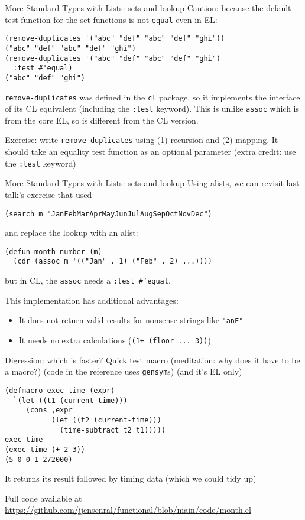 \documentclass[presentation]{beamer}
\begin{document}
\begin{frame}[fragile]{More Standard Types with Lists: sets and lookup}
Caution: because the default test function for the set functions is not \texttt{equal} even in EL:
\begin{verbatim}
(remove-duplicates '("abc" "def" "abc" "def" "ghi"))
("abc" "def" "abc" "def" "ghi")
(remove-duplicates '("abc" "def" "abc" "def" "ghi")
  :test #'equal)
("abc" "def" "ghi")
\end{verbatim}
\texttt{remove-duplicates} was defined in the \texttt{cl} package, so it implements the interface of its CL equivalent (including the \texttt{:test} keyword).  This is unlike \texttt{assoc} which is from the core EL, so is different from the CL version.

\medskip
Exercise: write \texttt{remove-duplicates} using (1) recursion and (2) mapping.  It should take an equality test function as an optional parameter (extra credit: use the \texttt{:test} keyword)
\end{frame}

\begin{frame}[fragile]{More Standard Types with Lists: sets and lookup}
Using alists, we can revisit last talk's exercise that used
\begin{verbatim}
(search m "JanFebMarAprMayJunJulAugSepOctNovDec")
\end{verbatim}
and replace the lookup with an alist:
\begin{verbatim}
(defun month-number (m)
  (cdr (assoc m '(("Jan" . 1) ("Feb" . 2) ...))))
\end{verbatim}
but in CL, the \texttt{assoc} needs a \texttt{:test \#'equal}.

\medskip
This implementation has additional advantages:
\begin{itemize}
\item It does not return valid results for nonsense strings like \texttt{"anF"}
\item It needs no extra calculations (\texttt{(1+ (floor ... 3))})
\end{itemize}
\end{frame}

\begin{frame}[fragile]{Digression: which is faster?}
Quick test macro (meditation: why does it have to be a macro?) (code in the reference uses \texttt{gensym}s) (and it's EL only)
\begin{verbatim}
(defmacro exec-time (expr)
  `(let ((t1 (current-time)))
     (cons ,expr
           (let ((t2 (current-time)))
             (time-subtract t2 t1)))))
exec-time
(exec-time (+ 2 3))
(5 0 0 1 272000)
\end{verbatim}
It returns its result followed by timing data (which we could tidy up)

\medskip
Full code available at \url{https://github.com/jjensenral/functional/blob/main/code/month.el}
\end{frame}
\end{document}
